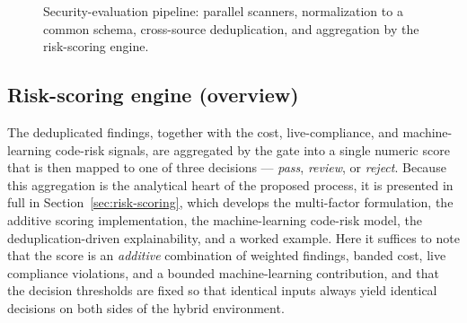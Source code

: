 \begin{figure}[ht]
\centering
{}
\caption{Security-evaluation pipeline: parallel scanners, normalization to a common
schema, cross-source deduplication, and aggregation by the risk-scoring engine.}
\label{fig:method-gate}
\end{figure}

\subsection{Risk-scoring engine (overview)}
\label{subsec:method-scoring}

The deduplicated findings, together with the cost, live-compliance, and
machine-learning code-risk signals, are aggregated by the gate into a single numeric
score that is then mapped to one of three decisions --- \emph{pass}, \emph{review}, or
\emph{reject}. Because this aggregation is the analytical heart of the proposed process,
it is presented in full in Section~\ref{sec:risk-scoring}, which develops the multi-factor
formulation, the additive scoring implementation, the machine-learning code-risk model,
the deduplication-driven explainability, and a worked example. Here it suffices to note
that the score is an \emph{additive} combination of weighted findings, banded cost, live
compliance violations, and a bounded machine-learning contribution, and that the decision
thresholds are fixed so that identical inputs always yield identical decisions on both
sides of the hybrid environment.


